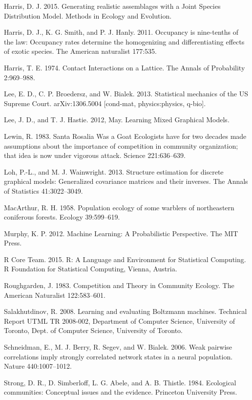 \documentclass[12pt,]{article}
\begin{document}
\begin{spacing}{1.9}
\begin{flushleft}
Harris, D. J. 2015. Generating realistic assemblages with a Joint
Species Distribution Model. Methods in Ecology and Evolution.

Harris, D. J., K. G. Smith, and P. J. Hanly. 2011. Occupancy is
nine-tenths of the law: Occupancy rates determine the homogenizing and
differentiating effects of exotic species. The American naturalist
177:535.

Harris, T. E. 1974. Contact Interactions on a Lattice. The Annals of
Probability 2:969--988.

Lee, E. D., C. P. Broedersz, and W. Bialek. 2013. Statistical mechanics
of the US Supreme Court. arXiv:1306.5004 {[}cond-mat, physics:physics,
q-bio{]}.

Lee, J. D., and T. J. Hastie. 2012, May. Learning Mixed Graphical
Models.

Lewin, R. 1983. Santa Rosalia Was a Goat Ecologists have for two decades
made assumptions about the importance of competition in community
organization; that idea is now under vigorous attack. Science
221:636--639.

Loh, P.-L., and M. J. Wainwright. 2013. Structure estimation for
discrete graphical models: Generalized covariance matrices and their
inverses. The Annals of Statistics 41:3022--3049.

MacArthur, R. H. 1958. Population ecology of some warblers of
northeastern coniferous forests. Ecology 39:599--619.

Murphy, K. P. 2012. Machine Learning: A Probabilistic Perspective. The
MIT Press.

R Core Team. 2015. R: A Language and Environment for Statistical
Computing. R Foundation for Statistical Computing, Vienna, Austria.

Roughgarden, J. 1983. Competition and Theory in Community Ecology. The
American Naturalist 122:583--601.

Salakhutdinov, R. 2008. Learning and evaluating Boltzmann machines.
Technical Report UTML TR 2008-002, Department of Computer Science,
University of Toronto, Dept. of Computer Science, University of Toronto.

Schneidman, E., M. J. Berry, R. Segev, and W. Bialek. 2006. Weak
pairwise correlations imply strongly correlated network states in a
neural population. Nature 440:1007--1012.

Strong, D. R., D. Simberloff, L. G. Abele, and A. B. Thistle. 1984.
Ecological communities: Conceptual issues and the evidence. Princeton
University Press.


\end{flushleft}
\end{spacing}
\end{document}
